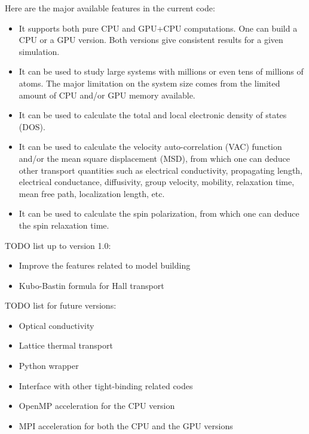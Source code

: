 \documentclass[12pt,a4paper]{report}
\begin{document}
Here are the major available features in the current code:
\begin{itemize}
\item It supports both pure CPU and GPU+CPU computations. One can build a CPU or a GPU version. Both versions give consistent results for a given simulation.
\item It can be used to study large systems with millions or even tens of millions of atoms. The major limitation on the system size comes from the limited amount of CPU and/or GPU memory available.
\item It can be used to calculate the total and local electronic density of states (DOS).
\item It can be used to calculate the velocity auto-correlation (VAC) function and/or the mean square displacement (MSD), from which one can deduce other transport quantities such as electrical conductivity, propagating length, electrical conductance, diffusivity, group velocity, mobility, relaxation time, mean free path, localization length, etc.
\item It can be used to calculate the spin polarization, from which one can deduce the spin relaxation time.
\end{itemize}

TODO list up to version 1.0:
\begin{itemize}
\item Improve the features related to model building
\item Kubo-Bastin formula for Hall transport
\end{itemize}


TODO list for future versions:
\begin{itemize}
\item Optical conductivity
\item Lattice thermal transport
\item Python wrapper
\item Interface with other tight-binding related codes
\item OpenMP acceleration for the CPU version
\item MPI acceleration for both the CPU and the GPU versions
\end{itemize}
\end{document}
